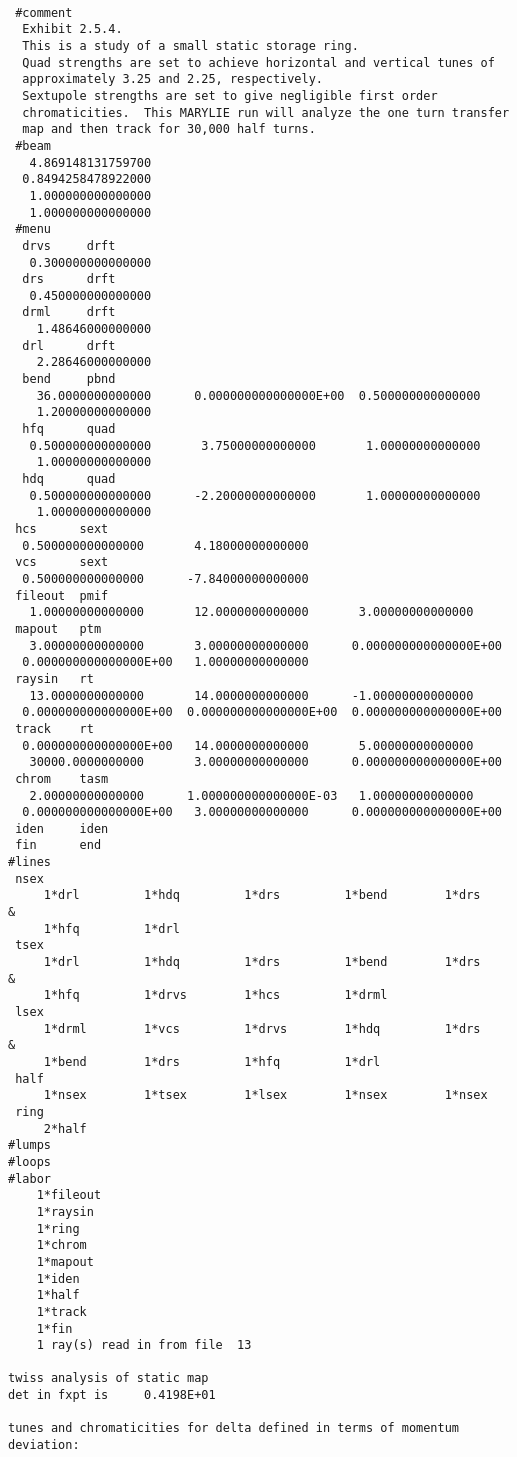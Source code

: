 {
\footnotesize\tt
\begin{verbatim}
 #comment
  Exhibit 2.5.4.
  This is a study of a small static storage ring.
  Quad strengths are set to achieve horizontal and vertical tunes of
  approximately 3.25 and 2.25, respectively.
  Sextupole strengths are set to give negligible first order
  chromaticities.  This MARYLIE run will analyze the one turn transfer
  map and then track for 30,000 half turns.
 #beam
   4.869148131759700
  0.8494258478922000
   1.000000000000000
   1.000000000000000
 #menu
  drvs     drft
   0.300000000000000
  drs      drft
   0.450000000000000
  drml     drft
    1.48646000000000
  drl      drft
    2.28646000000000
  bend     pbnd
    36.0000000000000      0.000000000000000E+00  0.500000000000000
    1.20000000000000
  hfq      quad
   0.500000000000000       3.75000000000000       1.00000000000000
    1.00000000000000
  hdq      quad
   0.500000000000000      -2.20000000000000       1.00000000000000
    1.00000000000000
 hcs      sext
  0.500000000000000       4.18000000000000
 vcs      sext
  0.500000000000000      -7.84000000000000
 fileout  pmif
   1.00000000000000       12.0000000000000       3.00000000000000
 mapout   ptm
   3.00000000000000       3.00000000000000      0.000000000000000E+00
  0.000000000000000E+00   1.00000000000000
 raysin   rt
   13.0000000000000       14.0000000000000      -1.00000000000000
  0.000000000000000E+00  0.000000000000000E+00  0.000000000000000E+00
 track    rt
  0.000000000000000E+00   14.0000000000000       5.00000000000000
   30000.0000000000       3.00000000000000      0.000000000000000E+00
 chrom    tasm
   2.00000000000000      1.000000000000000E-03   1.00000000000000
  0.000000000000000E+00   3.00000000000000      0.000000000000000E+00
 iden     iden
 fin      end
#lines
 nsex
     1*drl         1*hdq         1*drs         1*bend        1*drs      &
     1*hfq         1*drl
 tsex
     1*drl         1*hdq         1*drs         1*bend        1*drs      &
     1*hfq         1*drvs        1*hcs         1*drml
 lsex
     1*drml        1*vcs         1*drvs        1*hdq         1*drs      &
     1*bend        1*drs         1*hfq         1*drl
 half
     1*nsex        1*tsex        1*lsex        1*nsex        1*nsex
 ring
     2*half
#lumps
#loops
#labor
    1*fileout
    1*raysin
    1*ring
    1*chrom
    1*mapout
    1*iden
    1*half
    1*track
    1*fin
    1 ray(s) read in from file  13

twiss analysis of static map
det in fxpt is     0.4198E+01

tunes and chromaticities for delta defined in terms of momentum deviation:


\end{verbatim}}
